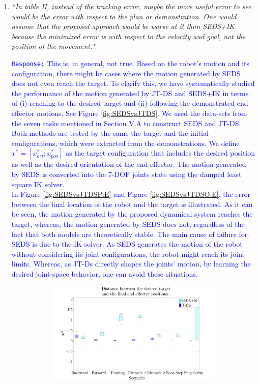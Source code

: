 \documentclass[10pt,stdletter,dateno]{newlfm}
\begin{document}
\begin{newlfm}
\begin{enumerate}
\item \textit{``In table II, instead of the tracking error, maybe the more useful
error to see would be the error with respect to the plan or
demonstration. One would assume that the proposed approach would be
worse at it than SEDS+IK because the minimized error is with respect to
the velocity and goal, not the position of the movement."}\\
\textcolor{blue}{\texttt{Response:} \small This is, in general, not true. Based on the robot's motion and its configuration, there might be cases where the motion generated by SEDS does not even reach the target. To clarify this, we have systematically studied the performance of the motion generated by JT-DS and SEDS+IK in terms of (i) reaching to the desired target and (ii) following the demonstrated end-effector motions, See Figure \ref{fig:SEDSvsJTDS}. We used the data-sets from the seven tasks mentioned in Section V.A to construct SEDS and JT-DS. Both methods are tested by the same the target and the initial configurations, which were extracted from the demonstrations. We define $ x^*=[x^*_{ori};x^*_{pos}] $ as the target configuration that includes the desired position as well as the desired  orientation of the end-effector. The motion generated by SEDS is converted into the 7-DOF joints state using the damped least square IK solver.\\ 
In Figure \ref{fig:SEDSvsJTDSP:E} and Figure \ref{fig:SEDSvsJTDSO:E}, the error between the final location of the robot and the target is illustrated. As it can be seen, the motion generated by the proposed dynamical system reaches the target, whereas, the motion generated by SEDS does not; regardless of the fact that both models are theoretically stable. The main cause of failure for SEDS is due to the IK solver. As SEDS generates the motion of the robot without considering its joint configurations, the robot might reach its joint limits.  Whereas, as JT-Ds directly shapes the joints' motion, by learning the desired joint-space behavior, one can avoid these situations.   \\ 
\begin{figure}[t]
 \hspace*{-2.4cm}
	\begin{subfigure}[t]{0.63\textwidth}
	\centering
		\includegraphics[trim={2cm 0.0cm 3.25cm 0cm},clip,width=\textwidth]{Pics/SEDS_JT_P_End.pdf}

\end{subfigure}
\end{figure}}
\end{enumerate}
\end{newlfm}
\end{document}
